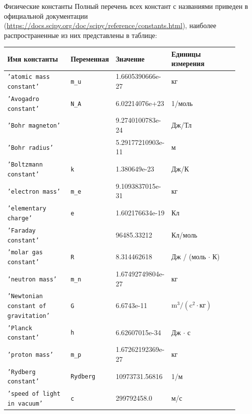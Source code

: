 \documentclass[aspectratio=169, mathserif]{beamer}	%
\begin{document}
\begin{frame}[fragile]{Физические константы}
\scriptsize
Полный перечень всех констант с названиями приведен в официальной документации  (\url{https://docs.scipy.org/doc/scipy/reference/constants.html}), наиболее распространенные из них представлены в таблице: 

\begin{table}[h!]
	\centering
	\label{tab:scipy.constants}
	
	\begin{tabular*}{\linewidth}{p{0.28\linewidth}p{0.15\linewidth}p{0.2\linewidth}p{0.3\linewidth}}
		\hline
		\textbf{Имя константы}& \textbf{Переменная} & \textbf{Значение} & \textbf{Единицы измерения} \\
		\hline
		
		\textcolor{ipython_red}{\texttt{'atomic mass constant'}} & \texttt{m\_u}& 1.6605390666e-27 & кг \\
		\textcolor{ipython_red}{\texttt{'Avogadro constant'}} & \texttt{N\_A}& 6.02214076e+23 & 1/моль \\
		\textcolor{ipython_red}{\texttt{'Bohr magneton'}} & & 9.2740100783e-24 & Дж/Тл \\
		\textcolor{ipython_red}{\texttt{'Bohr radius'}} & & 5.29177210903e-11 & м \\
		\textcolor{ipython_red}{\texttt{'Boltzmann constant'}} & \texttt{k} & 1.380649e-23 & Дж/К \\
		\textcolor{ipython_red}{\texttt{'electron mass'}} & \texttt{m\_e} & 9.1093837015e-31 & кг \\
		\textcolor{ipython_red}{\texttt{'elementary charge'}} & \texttt{e} & 1.602176634e-19 & Кл \\
		\textcolor{ipython_red}{\texttt{'Faraday constant'}} &  & 96485.33212 & Кл/моль \\
		\textcolor{ipython_red}{\texttt{'molar gas constant'}} & \texttt{R} & 8.314462618 & Дж / (моль $\cdot$ К) \\
		\textcolor{ipython_red}{\texttt{'neutron mass'}} & \texttt{m\_n} & 1.67492749804e-27 & кг \\
		
		\textcolor{ipython_red}{\texttt{'Newtonian constant of gravitation'}} & \texttt{G} & 6.6743e-11 & $\text{m}^3 / (\text{c}^2 \cdot \text{кг})$ \\
		
		\textcolor{ipython_red}{\texttt{'Planck constant'}} & \texttt{h} & 6.62607015e-34 & Дж $\cdot$ с \\
		\textcolor{ipython_red}{\texttt{'proton mass'}} & \texttt{m\_p} & 1.67262192369e-27 & кг \\
		\textcolor{ipython_red}{\texttt{'Rydberg constant'}} & \texttt{Rydberg} & 10973731.56816 & 1/м \\
		\textcolor{ipython_red}{\texttt{'speed of light in vacuum'}} & \texttt{c} & 299792458.0 & м/с \\
		\hline
	\end{tabular*}
\end{table}
\vfil
\end{frame}
\end{document}
